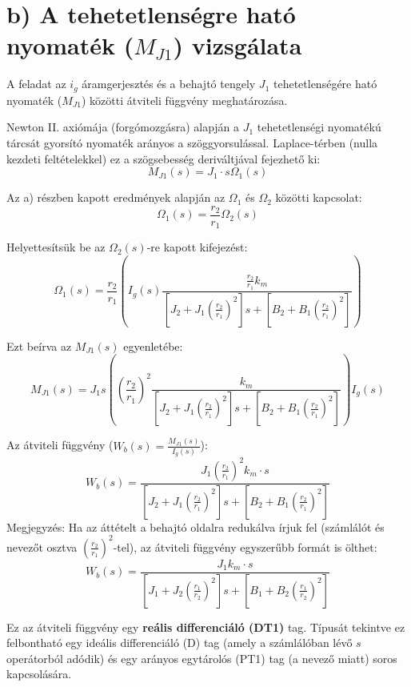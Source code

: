 \section{b) A tehetetlenségre ható nyomaték ($M_{J1}$) vizsgálata}

A feladat az $i_g$ áramgerjesztés és a behajtó tengely $J_1$ tehetetlenségére ható nyomaték ($M_{J1}$) közötti átviteli függvény meghatározása.

Newton II. axiómája (forgómozgásra) alapján a $J_1$ tehetetlenségi nyomatékú tárcsát gyorsító nyomaték arányos a szöggyorsulással. Laplace-térben (nulla kezdeti feltételekkel) ez a szögsebesség deriváltjával fejezhető ki:
\begin{equation}
	M_{J1}(s) = J_1 \cdot s \Omega_1(s)
\end{equation}

Az a) részben kapott eredmények alapján az $\Omega_1$ és $\Omega_2$ közötti kapcsolat:
\begin{equation}
	\Omega_1(s) = \frac{r_2}{r_1} \Omega_2(s)
\end{equation}

Helyettesítsük be az $\Omega_2(s)$-re kapott kifejezést:
\begin{equation}
	\Omega_1(s) = \frac{r_2}{r_1} \left( I_g(s) \frac{\frac{r_2}{r_1} k_m}{\left[ J_2 + J_1 \left(\frac{r_2}{r_1}\right)^2 \right] s + \left[ B_2 + B_1 \left(\frac{r_2}{r_1}\right)^2 \right]} \right)
\end{equation}

Ezt beírva az $M_{J1}(s)$ egyenletébe:
\begin{equation}
	M_{J1}(s) = J_1 s \left( \left(\frac{r_2}{r_1}\right)^2 \frac{k_m}{\left[ J_2 + J_1 \left(\frac{r_2}{r_1}\right)^2 \right] s + \left[ B_2 + B_1 \left(\frac{r_2}{r_1}\right)^2 \right]} \right) I_g(s)
\end{equation}

Az átviteli függvény ($W_b(s) = \frac{M_{J1}(s)}{I_g(s)}$):
\begin{equation}
	W_b(s) = \frac{J_1 \left(\frac{r_2}{r_1}\right)^2 k_m \cdot s}{\left[ J_2 + J_1 \left(\frac{r_2}{r_1}\right)^2 \right] s + \left[ B_2 + B_1 \left(\frac{r_2}{r_1}\right)^2 \right]}
\end{equation}
Megjegyzés: Ha az áttételt a behajtó oldalra redukálva írjuk fel (számlálót és nevezőt osztva $\left(\frac{r_2}{r_1}\right)^2$-tel), az átviteli függvény egyszerűbb formát is ölthet:
\begin{equation}
	W_b(s) = \frac{J_1 k_m \cdot s}{\left[ J_1 + J_2 \left(\frac{r_1}{r_2}\right)^2 \right] s + \left[ B_1 + B_2 \left(\frac{r_1}{r_2}\right)^2 \right]}
\end{equation}

Ez az átviteli függvény egy \textbf{reális differenciáló (DT1)} tag. Típusát tekintve ez felbontható egy ideális differenciáló (D) tag (amely a számlálóban lévő $s$ operátorból adódik) és egy arányos egytárolós (PT1) tag (a nevező miatt) soros kapcsolására.
